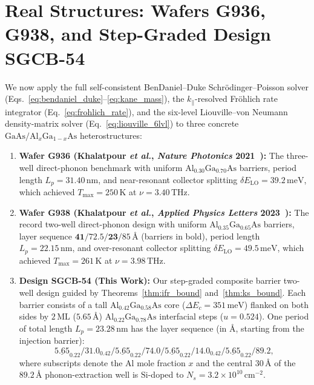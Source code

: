 \documentclass[11pt,letterpaper]{article}
\begin{document}
\section{Real Structures: Wafers G936, G938, and Step-Graded Design SGCB-54}
\label{sec:real_structures}

We now apply the full self-consistent BenDaniel--Duke Schr\"odinger--Poisson solver (Eqs.~\ref{eq:bendaniel_duke}--\ref{eq:kane_mass}), the $k_\parallel$-resolved Fr\"ohlich rate integrator (Eq.~\ref{eq:frohlich_rate}), and the six-level Liouville--von Neumann density-matrix solver (Eq.~\ref{eq:liouville_6lvl}) to three concrete $\mathrm{GaAs}/\mathrm{Al}_x\mathrm{Ga}_{1-x}\mathrm{As}$ heterostructures:
\begin{enumerate}
    \item \textbf{Wafer G936 (Khalatpour \textit{et al.}, \textit{Nature Photonics} 2021~\cite{Khalatpour2021}):} The three-well direct-phonon benchmark with uniform $\mathrm{Al}_{0.30}\mathrm{Ga}_{0.70}\mathrm{As}$ barriers, period length $L_p = 31.40\,\mathrm{nm}$, and near-resonant collector splitting $\delta E_{\mathrm{LO}} = 39.2\,\mathrm{meV}$, which achieved $T_{\max} = 250\,\mathrm{K}$ at $\nu = 3.40\,\mathrm{THz}$.
    \item \textbf{Wafer G938 (Khalatpour \textit{et al.}, \textit{Applied Physics Letters} 2023~\cite{Khalatpour2023}):} The record two-well direct-phonon design with uniform $\mathrm{Al}_{0.35}\mathrm{Ga}_{0.65}\mathrm{As}$ barriers, layer sequence $\mathbf{41}/72.5/\mathbf{23}/85$\,\AA{} (barriers in bold), period length $L_p = 22.15\,\mathrm{nm}$, and over-resonant collector splitting $\delta E_{\mathrm{LO}} = 49.5\,\mathrm{meV}$, which achieved $T_{\max} = 261\,\mathrm{K}$ at $\nu = 3.98\,\mathrm{THz}$.
    \item \textbf{Design SGCB-54 (This Work):} Our step-graded composite barrier two-well design guided by Theorems~\ref{thm:ifr_bound} and~\ref{thm:ks_bound}. Each barrier consists of a tall $\mathrm{Al}_{0.42}\mathrm{Ga}_{0.58}\mathrm{As}$ core ($\Delta E_c = 351\,\mathrm{meV}$) flanked on both sides by $2\,\mathrm{ML}$ ($5.65$\,\AA) $\mathrm{Al}_{0.22}\mathrm{Ga}_{0.78}\mathrm{As}$ interfacial steps ($u = 0.524$). One period of total length $L_p = 23.28\,\mathrm{nm}$ has the layer sequence (in \AA, starting from the injection barrier):
    \begin{equation}
    \underline{5.65}_{0.22} / \mathbf{31.0}_{0.42} / \underline{5.65}_{0.22} / 74.0 / \underline{5.65}_{0.22} / \mathbf{14.0}_{0.42} / \underline{5.65}_{0.22} / 89.2,
    \label{eq:sgcb54_sequence}
    \end{equation}
    where subscripts denote the $\mathrm{Al}$ mole fraction $x$ and the central $30$\,\AA{} of the $89.2$\,\AA{} phonon-extraction well is $\mathrm{Si}$-doped to $N_s = 3.2 \times 10^{10}\,\mathrm{cm}^{-2}$.
\end{enumerate}
\end{document}
